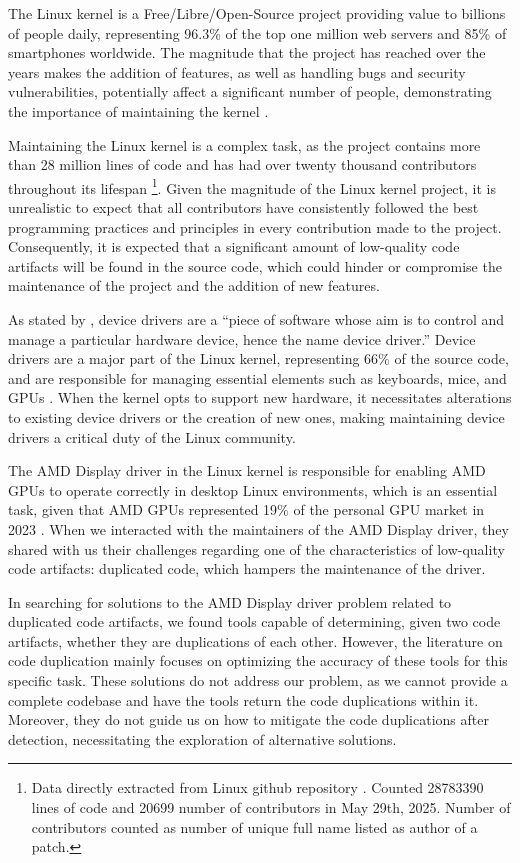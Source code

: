 \en

The Linux kernel is a Free/Libre/Open-Source project providing value to
billions of people daily, representing 96.3\% of the top one million web
servers and 85\% of smartphones worldwide. The magnitude that the project has
reached over the years makes the addition of features, as well as handling bugs
and security vulnerabilities, potentially affect a significant number of
people, demonstrating the importance of maintaining the kernel
\citep{linuxdata}.

Maintaining the Linux kernel is a complex task, as the project contains more
than 28 million lines of code and has had over twenty thousand contributors
throughout its lifespan
\footnote{Data directly extracted from Linux github repository \citep{linuxrepo}.
Counted  28783390 lines of code and 20699 number of contributors in May 29th, 2025.
Number of contributors counted as number of unique full name listed as author of a patch.}.
Given the magnitude of the Linux
kernel project, it is unrealistic to expect that all contributors have
consistently followed the best programming practices and principles in every
contribution made to the project. Consequently, it is expected that a
significant amount of low-quality code artifacts will be found in the source
code, which could hinder or compromise the maintenance of the project and the
addition of new features.

As stated by \citet{driverdef}, device drivers are a ``piece of software whose
aim is to control and manage a particular hardware device, hence the name
device driver.'' Device drivers are a major part of the Linux kernel,
representing 66\% of the source code, and are responsible for managing
essential elements such as keyboards, mice, and GPUs \citep{marcelo}. When the
kernel opts to support new hardware, it necessitates alterations to existing
device drivers or the creation of new ones, making maintaining device drivers a
critical duty of the Linux community.

The AMD Display driver in the Linux kernel is responsible for enabling AMD GPUs
to operate correctly in desktop Linux environments, which is an essential task,
given that AMD GPUs represented 19\% of the personal GPU market in 2023
\citep{gpumarket}. When we interacted with the maintainers of the AMD Display
driver, they shared with us their challenges regarding one of the
characteristics of low-quality code artifacts: duplicated code, which hampers
the maintenance of the driver.

In searching for solutions to the AMD Display driver problem related to
duplicated code artifacts, we found tools capable of determining, given two
code artifacts, whether they are duplications of each other. However, the
literature on code duplication mainly focuses on optimizing the accuracy
of these tools for this specific task. These solutions do not address our
problem, as we cannot provide a complete codebase and have the tools return the
code duplications within it. Moreover, they do not guide us on how to mitigate
the code duplications after detection, necessitating the exploration of
alternative solutions.

